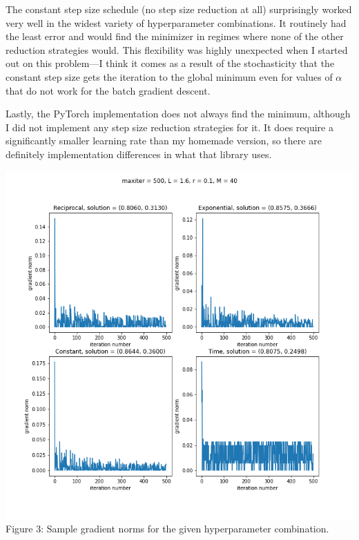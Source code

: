 \documentclass{letter}
\newcounter{problem}
\begin{document}
{    The constant step size schedule (no step size reduction at all) surprisingly worked very well in the widest variety of hyperparameter combinations. It routinely had the least error and would find the minimizer in regimes where none of the other reduction strategies would. This flexibility was highly unexpected when I started out on this problem---I think it comes as a result of the stochasticity that the constant step size gets the iteration to the global minimum even for values of $\alpha$ that do not work for the batch gradient descent.

    Lastly, the PyTorch implementation does not always find the minimum, although I did not implement any step size reduction strategies for it. It does require a significantly smaller learning rate than my homemade version, so there are definitely implementation differences in what that library uses.
    
    \begin{center}
        \includegraphics[scale=0.75]{../pics/schedules.png} \\
        Figure 3: Sample gradient norms for the given hyperparameter combination.
    \end{center}}
\end{document}

